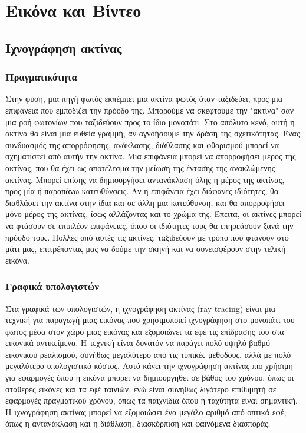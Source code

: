 \section{Εικόνα και Βίντεο}

\subsection{Ιχνογράφηση ακτίνας}
\subsubsection{Πραγματικότητα}
Στην φύση, μια πηγή φωτός εκπέμπει μια ακτίνα φωτός όταν ταξιδεύει, προς μια επιφάνεια που εμποδίζει την πρόοδο της. Μπορούμε να σκεφτούμε την "ακτίνα" σαν μια ροή φωτονίων που ταξιδεύουν προς το ίδιο μονοπάτι. Στο απόλυτο κενό, αυτή η ακτίνα θα είναι μια ευθεία γραμμή, αν αγνοήσουμε την δράση της σχετικότητας. Ένας συνδυασμός της απορρόφησης, ανάκλασης, διάθλασης και φθορισμού μπορεί να σχηματιστεί από αυτήν την ακτίνα. Μια επιφάνεια μπορεί να απορροφήσει μέρος της ακτίνας, που θα έχει ως αποτέλεσμα την μείωση της έντασης της ανακλώμενης ακτίνας. Μπορεί επίσης να δημιουργήσει αντανάκλαση όλης η μέρος της ακτίνας, προς μία ή παραπάνω κατευθύνσεις. Αν η επιφάνεια έχει διάφανες ιδιότητες, θα διαθλάσει την ακτίνα στην ίδια και σε άλλη μια κατεύθυνση, και θα απορροφήσει μόνο μέρος της ακτίνας, ίσως αλλάζοντας και το χρώμα της. Έπειτα, οι ακτίνες μπορεί να φτάσουν σε επιπλέον επιφάνειες, όπου οι ιδιότητες τους θα επηρεάσουν ξανά την πρόοδο τους. Πολλές από αυτές τις ακτίνες, ταξιδεύουν με τρόπο που φτάνουν στο μάτι μας, επιτρέποντας μας να δούμε την σκηνή και να συνεισφέρουν στην τελική εικόνα. 


\subsubsection{Γραφικά υπολογιστών}
Στα γραφικά των υπολογιστών, η ιχνογράφηση ακτίνας (ray tracing) είναι μια τεχνική για παραγωγή μιας εικόνας που χρησιμοποιεί ιχνογράφηση στο μονοπάτι του φωτός μέσα στον χώρο μιας εικόνας και εξομοιώνει τα εφέ τις επίδρασης του στα εικονικά αντικείμενα. Η τεχνική είναι δυνατόν να παράγει πολύ υψηλό βαθμό εικονικού ρεαλισμού, συνήθως μεγαλύτερο από τις τυπικές μεθόδους, αλλά με πολύ μεγαλύτερο υπολογιστικό κόστος. Αυτό κάνει την ιχνογράφηση ακτίνας πιο χρήσιμη για εφαρμογές όπου η εικόνα μπορεί να δημιουργηθεί σε βάθος του χρόνου, όπως οι σταθερές εικόνες και τα εφέ ταινιών, ενώ είναι συνήθως λιγότερο επιθυμητή σε εφαρμογές πραγματικού χρόνου, όπως τα παιχνίδια όπου η ταχύτητα είναι σημαντική. Η ιχνογράφηση ακτίνας μπορεί να εξομοιώσει ένα μεγάλο αριθμό από οπτικά εφέ, όπως η αντανάκλαση και η διάθλαση, διασκόρπιση και φαινόμενα διασποράς.

